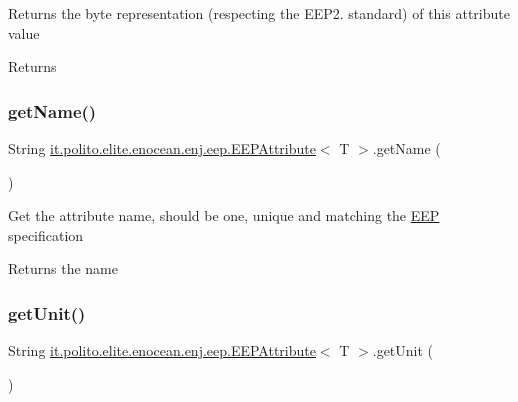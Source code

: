 Returns the byte representation (respecting the E\+E\+P2. standard) of this attribute value

\begin{DoxyReturn}{Returns}

\end{DoxyReturn}
\hypertarget{classit_1_1polito_1_1elite_1_1enocean_1_1enj_1_1eep_1_1_e_e_p_attribute_a3d60ab7df4e3a06e65f73a180aca49df}{}\label{classit_1_1polito_1_1elite_1_1enocean_1_1enj_1_1eep_1_1_e_e_p_attribute_a3d60ab7df4e3a06e65f73a180aca49df} 
\subsubsection{\texorpdfstring{get\+Name()}{getName()}}
{\footnotesize\ttfamily String \hyperlink{classit_1_1polito_1_1elite_1_1enocean_1_1enj_1_1eep_1_1_e_e_p_attribute}{it.\+polito.\+elite.\+enocean.\+enj.\+eep.\+E\+E\+P\+Attribute}$<$ T $>$.get\+Name (\begin{DoxyParamCaption}{ }\end{DoxyParamCaption})}

Get the attribute name, should be one, unique and matching the \hyperlink{classit_1_1polito_1_1elite_1_1enocean_1_1enj_1_1eep_1_1_e_e_p}{E\+EP} specification

\begin{DoxyReturn}{Returns}
the name 
\end{DoxyReturn}
\hypertarget{classit_1_1polito_1_1elite_1_1enocean_1_1enj_1_1eep_1_1_e_e_p_attribute_a881aa5b7ef75355b5a2af18cc85ee135}{}\label{classit_1_1polito_1_1elite_1_1enocean_1_1enj_1_1eep_1_1_e_e_p_attribute_a881aa5b7ef75355b5a2af18cc85ee135} 
\subsubsection{\texorpdfstring{get\+Unit()}{getUnit()}}
{\footnotesize\ttfamily String \hyperlink{classit_1_1polito_1_1elite_1_1enocean_1_1enj_1_1eep_1_1_e_e_p_attribute}{it.\+polito.\+elite.\+enocean.\+enj.\+eep.\+E\+E\+P\+Attribute}$<$ T $>$.get\+Unit (\begin{DoxyParamCaption}{ }\end{DoxyParamCaption})}

